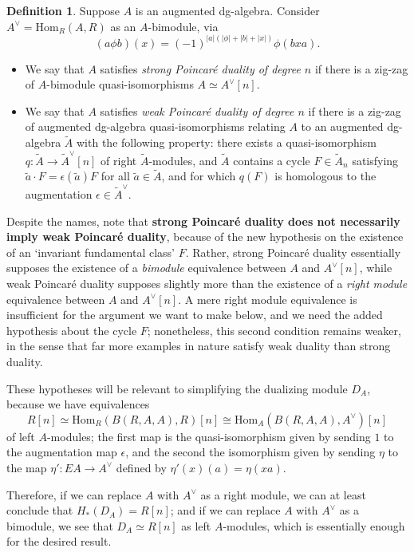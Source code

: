 \documentclass{memo-l}
\theoremstyle{definition}
\newtheorem{definition}[theorem]{Definition}
\theoremstyle{remark}
\numberwithin{section}{chapter}
\numberwithin{equation}{chapter}
\begin{document}
\begin{definition}
Suppose $A$ is an augmented dg-algebra. Consider $A^\vee = \text{Hom}_R(A, R)$ as an $A$-bimodule, via $$(a \phi b)(x) = (-1)^{|a|(|\phi|+|b|+|x|)}\phi(bxa).$$ 
\begin{itemize}
\item We say that $A$ satisfies \emph{strong Poincar\'e duality of degree $n$} if there is a zig-zag of $A$-bimodule quasi-isomorphisms $A \simeq A^\vee[n]$. 
\item We say that $A$ satisfies \emph{weak Poincar\'e duality of degree $n$} if there is a zig-zag of augmented dg-algebra quasi-isomorphisms relating $A$ to an augmented dg-algebra $\tilde A$ with the following property: there exists a quasi-isomorphism $q: \tilde A \to \tilde A^\vee[n]$ of right $\tilde A$-modules, and $\tilde A$ contains a cycle $F \in \tilde A_n$ satisfying $\tilde a \cdot F = \epsilon(\tilde a)F$ for all $\tilde a \in \tilde A$, and for which $q(F)$ is homologous to the augmentation $\epsilon \in \tilde A^\vee$. 
\end{itemize}
\end{definition}

Despite the names, note that \textbf{strong Poincar\'e duality does not necessarily imply weak Poincar\'e duality}, because of the new hypothesis on the existence of an `invariant fundamental class' $F$. Rather, strong Poincar\'e duality essentially supposes the existence of a \textit{bimodule} equivalence between $A$ and $A^\vee[n]$, while weak Poincar\'e duality supposes slightly more than the existence of a \textit{right module} equivalence between $A$ and $A^\vee[n]$. A mere right module equivalence is insufficient for the argument we want to make below, and we need the added hypothesis about the cycle $F$; nonetheless, this second condition remains weaker, in the sense that far more examples in nature satisfy weak duality than strong duality.

These hypotheses will be relevant to simplifying the dualizing module $D_A$, because we have equivalences $$R[n] \simeq \text{Hom}_R(B(R, A, A), R)[n] \cong \text{Hom}_A(B(R,A,A), A^\vee)[n]$$ of left $A$-modules; the first map is the quasi-isomorphism given by sending $1$ to the augmentation map $\epsilon$, and the second the isomorphism given by sending $\eta$ to the map $\eta': EA \to A^\vee$ defined by $\eta'(x)(a) = \eta(xa)$. 

Therefore, if we can replace $A$ with $A^\vee$ as a right module, we can at least conclude that $H_*(D_A) = R[n]$; and if we can replace $A$ with $A^\vee$ as a bimodule, we see that $D_A \simeq R[n]$ as left $A$-modules, which is essentially enough for the desired result.
\end{document}

